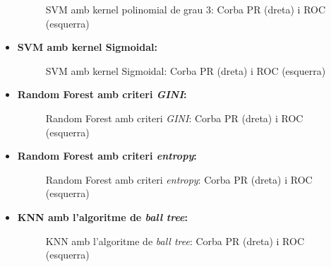 \documentclass[a4paper, 11pt]{article}
\begin{document}
\begin{itemize}
                \begin{figure}[H]%
                \centering
                \qquad
                \caption*{SVM amb kernel polinomial de grau 3: Corba PR (dreta) i ROC (esquerra)}
                \end{figure}

            \newpage
            \item \textbf{SVM amb kernel Sigmoidal:}


                \begin{figure}[H]%
                \centering
                \qquad
                \caption*{SVM amb kernel Sigmoidal: Corba PR (dreta) i ROC (esquerra)}
                \end{figure}

            \item \textbf{Random Forest amb criteri \textit{GINI}:}


                \begin{figure}[H]%
                \centering
                \qquad
                \caption*{Random Forest amb criteri \textit{GINI}: Corba PR (dreta) i ROC (esquerra)}
                \end{figure}

            \item \textbf{Random Forest amb criteri \textit{entropy}:}


                \begin{figure}[H]%
                \centering
                \qquad
                \caption*{Random Forest amb criteri \textit{entropy}: Corba PR (dreta) i ROC (esquerra)}
                \end{figure}
            \newpage
            \item \textbf{KNN amb l'algoritme de \textit{ball tree}:}


                \begin{figure}[H]%
                \centering
                \qquad
                \caption*{KNN amb l'algoritme de \textit{ball tree}: Corba PR (dreta) i ROC (esquerra)}
                \end{figure}



\end{itemize}
\end{document}
